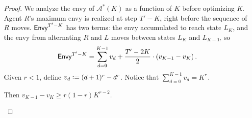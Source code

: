 \begin{proof}


We analyze the envy of $\mathcal{A}^*(K)$ as a function of $K$ before optimizing $K$.
Agent $R$'s maximum envy is realized at step $T' - K$, right before the sequence of $R$ moves. $\mathsf{Envy}^{T'-K}$ has two terms: the envy accumulated to reach state $L_{K}$, and the envy from alternating $R$ and $L$ moves between states $L_{K}$ and $L_{K-1}$, so 
%
\begin{align}
\mathsf{Envy}^{T'-K} 
= \sum_{d=0}^{K-1} v_d + \frac{T'-2K}{2} \cdot \left( v_{K-1}-v_{K} \right). \label{eq:adaptive1}
\end{align}
%
Given $r<1$, define $v_d \vcentcolon= (d+1)^r - d^r$.  Notice that $\sum_{d=0}^{K-1} v_d = K^r$. 


\begin{lemma}
	\label{lem:lb:bound-diff}
	 Then $v_{K-1} - v_{K} \geq r (1-r) K^{r-2}$.
\end{lemma}


\end{proof}

